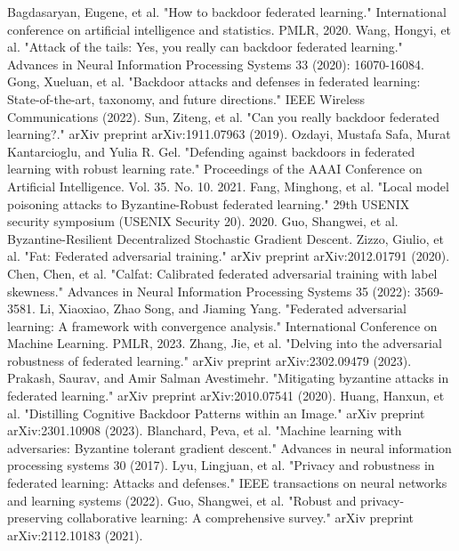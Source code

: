 \documentclass[conference]{IEEEtran}
\begin{document}
\begin{thebibliography}{00}
     Bagdasaryan, Eugene, et al. "How to backdoor federated learning." International conference on artificial intelligence and statistics. PMLR, 2020.  
     Wang, Hongyi, et al. "Attack of the tails: Yes, you really can backdoor federated learning." Advances in Neural Information Processing Systems 33 (2020): 16070-16084.   
     Gong, Xueluan, et al. "Backdoor attacks and defenses in federated learning: State-of-the-art, taxonomy, and future directions." IEEE Wireless Communications (2022).  
     Sun, Ziteng, et al. "Can you really backdoor federated learning?." arXiv preprint arXiv:1911.07963 (2019).  
     Ozdayi, Mustafa Safa, Murat Kantarcioglu, and Yulia R. Gel. "Defending against backdoors in federated learning with robust learning rate." Proceedings of the AAAI Conference on Artificial Intelligence. Vol. 35. No. 10. 2021.  
     Fang, Minghong, et al. "Local model poisoning attacks to {Byzantine-Robust} federated learning." 29th USENIX security symposium (USENIX Security 20). 2020.  
     Guo, Shangwei, et al. Byzantine-Resilient Decentralized Stochastic Gradient Descent.  
     Zizzo, Giulio, et al. "Fat: Federated adversarial training." arXiv preprint arXiv:2012.01791 (2020).  
     Chen, Chen, et al. "Calfat: Calibrated federated adversarial training with label skewness." Advances in Neural Information Processing Systems 35 (2022): 3569-3581.  
     Li, Xiaoxiao, Zhao Song, and Jiaming Yang. "Federated adversarial learning: A framework with convergence analysis." International Conference on Machine Learning. PMLR, 2023.  
     Zhang, Jie, et al. "Delving into the adversarial robustness of federated learning." arXiv preprint arXiv:2302.09479 (2023).  
     Prakash, Saurav, and Amir Salman Avestimehr. "Mitigating byzantine attacks in federated learning." arXiv preprint arXiv:2010.07541 (2020).   
     Huang, Hanxun, et al. "Distilling Cognitive Backdoor Patterns within an Image." arXiv preprint arXiv:2301.10908 (2023).   
     Blanchard, Peva, et al. "Machine learning with adversaries: Byzantine tolerant gradient descent." Advances in neural information processing systems 30 (2017).   
     Lyu, Lingjuan, et al. "Privacy and robustness in federated learning: Attacks and defenses." IEEE transactions on neural networks and learning systems (2022).    
     Guo, Shangwei, et al. "Robust and privacy-preserving collaborative learning: A comprehensive survey." arXiv preprint arXiv:2112.10183 (2021).    

\end{thebibliography}
\end{document}
